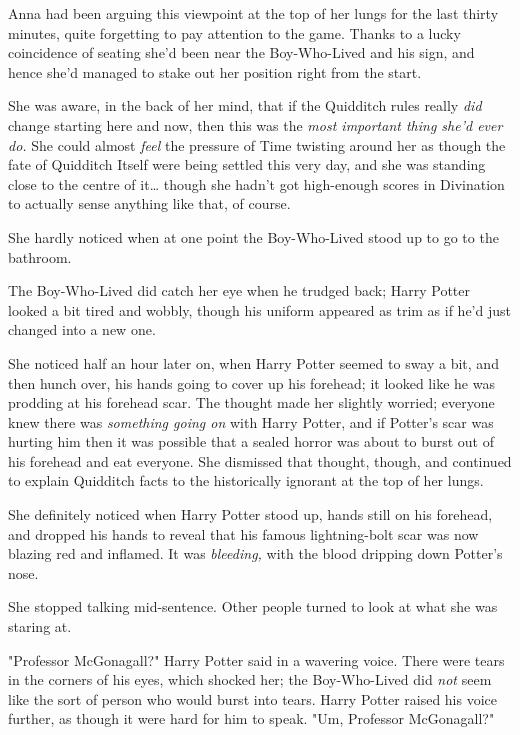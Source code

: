Anna had been arguing this viewpoint at the top of her lungs for the last
thirty minutes, quite forgetting to pay attention to the game. Thanks to a
lucky coincidence of seating she'd been near the Boy-Who-Lived and his sign,
and hence she'd managed to stake out her position right from the start.

She was aware, in the back of her mind, that if the Quidditch rules really
\emph{did} change starting here and now, then this was the \emph{most important
thing she'd ever do.} She could almost \emph{feel} the pressure of Time
twisting around her as though the fate of Quidditch Itself were being settled
this very day, and she was standing close to the centre of it{\ldots} though
she hadn't got high-enough scores in Divination to actually sense anything
like that, of course.

She hardly noticed when at one point the Boy-Who-Lived stood up to go to the
bathroom.

The Boy-Who-Lived did catch her eye when he trudged back; Harry Potter looked a
bit tired and wobbly, though his uniform appeared as trim as if he'd just
changed into a new one.

She noticed half an hour later on, when Harry Potter seemed to sway a bit, and
then hunch over, his hands going to cover up his forehead; it looked like he
was prodding at his forehead scar. The thought made her slightly worried;
everyone knew there was \emph{something going on} with Harry Potter, and if
Potter's scar was hurting him then it was possible that a sealed horror was
about to burst out of his forehead and eat everyone. She dismissed that
thought, though, and continued to explain Quidditch facts to the historically
ignorant at the top of her lungs.

She definitely noticed when Harry Potter stood up, hands still on his forehead,
and dropped his hands to reveal that his famous lightning-bolt scar was now
blazing red and inflamed. It was \emph{bleeding,} with the blood dripping down
Potter's nose.

She stopped talking mid-sentence. Other people turned to look at what she was
staring at.

"Professor McGonagall?" Harry Potter said in a wavering voice. There were tears
in the corners of his eyes, which shocked her; the Boy-Who-Lived did \emph{not}
seem like the sort of person who would burst into tears. Harry Potter raised
his voice further, as though it were hard for him to speak. "Um, Professor
McGonagall?"

